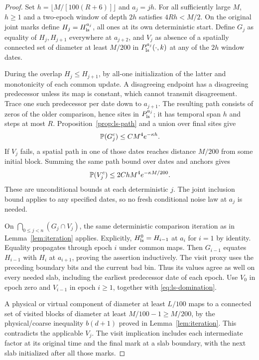 \begin{proof}
Set \(h=\lfloor M/[100(R+6)]\rfloor\) and \(a_j=jh\).
For all sufficiently large \(M\), \(h\ge1\) and a
two-epoch window of depth \(2h\) satisfies \(4Rh<M/2\).
On the original joint marks define
\(H_j=H_{\rm ls}^{a_j}\), all ones at its own deterministic
start. Define \(G_j\) as equality of \(H_j,H_{j+1}\)
everywhere at \(a_{j+2}\), and \(V_j\) as absence of a
spatially connected set of diameter at least \(M/200\)
in \(P_{\rm ls}^{a_j}(\cdot,k)\) at any of the \(2h\)
window dates.

During the overlap \(H_j\le H_{j+1}\), by all-one
initialization of the latter and monotonicity of each
common update. A disagreeing endpoint has a disagreeing
predecessor unless its map is constant, which cannot
transmit disagreement. Trace one such predecessor per
date down to \(a_{j+1}\). The resulting path consists
of zeros of the older comparison, hence sites in
\(P_{\rm ls}^{a_j}\); it has temporal span \(h\) and
steps at most \(R\). Proposition~\ref{prop:ls-path}
and a union over final sites give
\[
 \mathbb P(G_j^c)\le CM^4e^{-\kappa h}.
\]
If \(V_j\) fails, a spatial path in one of those dates
reaches distance \(M/200\) from some initial block.
Summing the same path bound over dates and anchors gives
\[
 \mathbb P(V_j^c)\le 2ChM^4e^{-\kappa M/200}.
\]
These are unconditional bounds at each deterministic
\(j\). The joint inclusion bound applies to any specified
dates, so no fresh conditional noise law at \(a_j\) is
needed.

On \(\bigcap_{0\le j<n}(G_j\cap V_j)\), the same
deterministic comparison iteration as in
Lemma~\ref{lem:iteration} applies. Explicitly,
\(H_{\rm ls}^0=H_{i-1}\) at \(a_i\) for \(i=1\) by
identity. Equality propagates through epoch \(i\)
under common maps. Then \(G_{i-1}\) equates
\(H_{i-1}\) with \(H_i\) at \(a_{i+1}\), proving
the assertion inductively. The visit proxy uses
the preceding boundary bits and the current bad bin.
Thus its values agree as well on every needed slab,
including the earliest predecessor date of each epoch.
Use \(V_0\) in epoch zero and \(V_{i-1}\) in epoch \(i\ge1\),
together with \eqref{eq:ls-domination}.

A physical or virtual component of diameter at least
\(L/100\) maps to a connected set of visited blocks
of diameter at least \(M/100-1\ge M/200\), by the
physical/coarse inequality \(b(d+1)\) proved in
Lemma~\ref{lem:iteration}. This contradicts the
applicable \(V_j\). The visit implication includes
each intermediate factor at its original time and
the final mark at a slab boundary, with the next slab
initialized after all those marks.


\end{proof}
